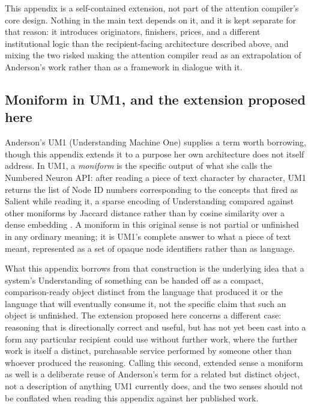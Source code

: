 \documentclass[11pt]{article}
\begin{document}
This appendix is a self-contained extension, not part of the attention compiler's core design. Nothing in the main text depends on it, and it is kept separate for that reason: it introduces originators, finishers, prices, and a different institutional logic than the recipient-facing architecture described above, and mixing the two risked making the attention compiler read as an extrapolation of Anderson's work rather than as a framework in dialogue with it.

\subsection{Moniform in UM1, and the extension proposed here}

Anderson's UM1 (Understanding Machine One) supplies a term worth borrowing, though this appendix extends it to a purpose her own architecture does not itself address. In UM1, a \emph{moniform} is the specific output of what she calls the Numbered Neuron API: after reading a piece of text character by character, UM1 returns the list of Node ID numbers corresponding to the concepts that fired as Salient while reading it, a sparse encoding of Understanding compared against other moniforms by Jaccard distance rather than by cosine similarity over a dense embedding \cite{anderson2022um1}. A moniform in this original sense is not partial or unfinished in any ordinary meaning; it is UM1's complete answer to what a piece of text meant, represented as a set of opaque node identifiers rather than as language.

What this appendix borrows from that construction is the underlying idea that a system's Understanding of something can be handed off as a compact, comparison-ready object distinct from the language that produced it or the language that will eventually consume it, not the specific claim that such an object is unfinished. The extension proposed here concerns a different case: reasoning that is directionally correct and useful, but has not yet been cast into a form any particular recipient could use without further work, where the further work is itself a distinct, purchasable service performed by someone other than whoever produced the reasoning. Calling this second, extended sense a moniform as well is a deliberate reuse of Anderson's term for a related but distinct object, not a description of anything UM1 currently does, and the two senses should not be conflated when reading this appendix against her published work.
\end{document}
